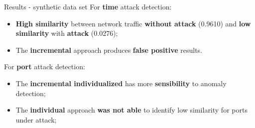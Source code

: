 \documentclass[newPxFont, numfooter, sectionpages]{beamer}
\begin{document}

\begin{frame}{Results - synthetic data set}
	For \textbf{time} attack detection:
	\begin{itemize}
		\item \textbf{High similarity} between network traffic \textbf{without attack} (0.9610) and \textbf{low similarity} with \textbf{attack} (0.0276);
		\item The \textbf{incremental} approach produces \textbf{false positive} results.
	\end{itemize}
	For \textbf{port} attack detection:
	\begin{itemize}
		\item The \textbf{incremental individualized} has more \textbf{sensibility} to anomaly detection;
		\item The \textbf{individual} approach \textbf{was not able} to identify low similarity for ports under attack;
	\end{itemize}
\end{frame}
\end{document}
